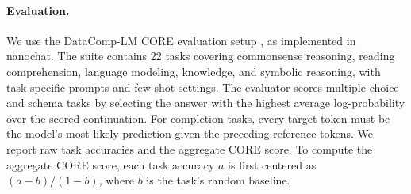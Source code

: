 \paragraph{Evaluation.}
We use the DataComp-LM CORE evaluation setup
\citep{li2025datacomplmsearchgenerationtraining}, as implemented in nanochat.
The suite contains 22 tasks covering commonsense reasoning, reading comprehension,
language modeling, knowledge, and symbolic reasoning, with task-specific prompts
and few-shot settings. The evaluator scores multiple-choice and schema tasks by
selecting the answer with the highest average log-probability over the scored
continuation. For completion tasks, every target token must be the model's most
likely prediction given the preceding reference tokens. We report raw task accuracies
and the aggregate CORE score. To compute the aggregate CORE score, each
task accuracy $a$ is first centered as $(a-b)/(1-b)$, where $b$ is the task's random
baseline.

